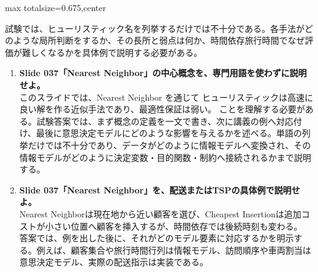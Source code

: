 \begin{adjustbox}{max totalsize={\textwidth}{0.675\textheight},center}
\begin{minipage}{\textwidth}
\begin{minipage}[t]{0.485\textwidth}
試験では、ヒューリスティック名を列挙するだけでは不十分である。各手法がどのような局所判断をするか、その長所と弱点は何か、時間依存旅行時間でなぜ評価が難しくなるかを具体例で説明する必要がある。\par
{}
\begin{enumerate}
\item \textbf{Slide 037「Nearest Neighbor」の中心概念を、専門用語を使わずに説明せよ。}\\このスライドでは、Nearest Neighbor を通じて ヒューリスティックは高速に良い解を作る近似手法であり、最適性保証は弱い。 ことを理解する必要がある。試験答案では、まず概念の定義を一文で書き、次に講義の例へ対応付け、最後に意思決定モデルにどのような影響を与えるかを述べる。単語の列挙だけでは不十分であり、データがどのように情報モデルへ変換され、その情報モデルがどのように決定変数・目的関数・制約へ接続されるかまで説明する。
\item \textbf{Slide 037「Nearest Neighbor」を、配送またはTSPの具体例で説明せよ。}\\Nearest Neighborは現在地から近い顧客を選び、Cheapest Insertionは追加コストが小さい位置へ顧客を挿入するが、時間依存では後続時刻も変わる。 答案では、例を出した後に、それがどのモデル要素に対応するかを明示する。例えば、顧客集合や旅行時間行列は情報モデル、訪問順序や車両割当は意思決定モデル、実際の配送指示は実装である。
\end{enumerate}
\end{minipage}
\end{minipage}
\end{adjustbox}

